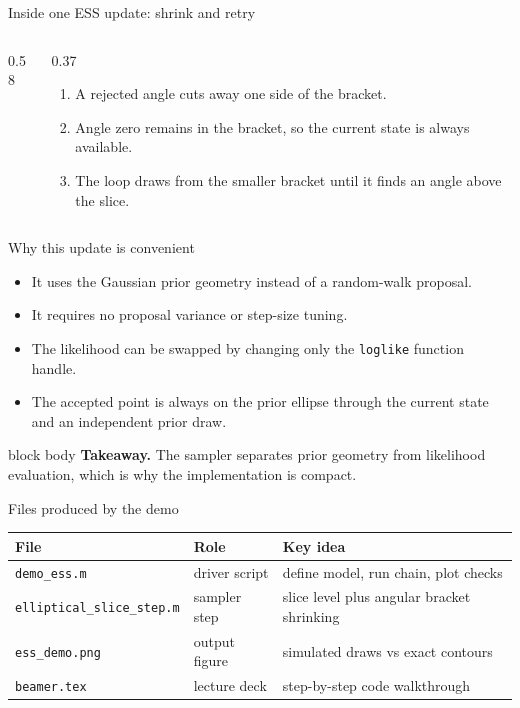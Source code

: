 \documentclass[aspectratio=169,11pt]{beamer}
\newcommand{\codefile}[1]{\texttt{#1}}
\newcommand{\takeaway}[1]{%
  \vspace{0.3em}
  \begin{beamercolorbox}[rounded=true,sep=0.7em,wd=\linewidth]{block body}
    \textbf{Takeaway.} #1
  \end{beamercolorbox}
}
\begin{document}
\begin{frame}[fragile]{Inside one ESS update: shrink and retry}
  \begin{columns}[T,totalwidth=\textwidth]
    \begin{column}{0.58\textwidth}
      
    \end{column}
    \begin{column}{0.37\textwidth}
      \begin{enumerate}
        \setlength{\itemsep}{0.65em}
        \item A rejected angle cuts away one side of the bracket.
        \item Angle zero remains in the bracket, so the current state is always available.
        \item The loop draws from the smaller bracket until it finds an angle above the slice.
      \end{enumerate}
    \end{column}
  \end{columns}
\end{frame}

\begin{frame}{Why this update is convenient}
  \begin{itemize}
    \setlength{\itemsep}{0.9em}
    \item It uses the Gaussian prior geometry instead of a random-walk proposal.
    \item It requires no proposal variance or step-size tuning.
    \item The likelihood can be swapped by changing only the \texttt{loglike} function handle.
    \item The accepted point is always on the prior ellipse through the current state and an independent prior draw.
  \end{itemize}
  \takeaway{The sampler separates prior geometry from likelihood evaluation, which is why the implementation is compact.}
\end{frame}

    \scriptsize
\begin{frame}{Files produced by the demo}
  \begin{center}
    \begin{tabular}{@{}lll@{}}
      \toprule
      File & Role & Key idea\\
      \midrule
      \codefile{demo\_ess.m} & driver script & define model, run chain, plot checks\\
      \codefile{elliptical\_slice\_step.m} & sampler step & slice level plus angular bracket shrinking\\
      \codefile{ess\_demo.png} & output figure & simulated draws vs exact contours\\
      \codefile{beamer.tex} & lecture deck & step-by-step code walkthrough\\
      \bottomrule
    \end{tabular}
  \end{center}
\end{frame}
\end{document}
